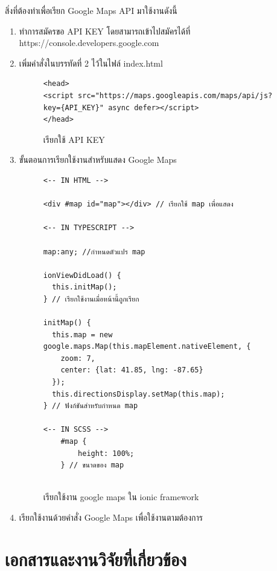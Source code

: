 	สิ่งที่ต้องทำเพื่อเรียก Google Maps API มาใช้งานดังนี้
	\begin{enumerate}[label=\arabic*)]
		\item ทำการสมัครขอ API KEY โดยสามารถเข้าไปสมัครได้ที่ https://console.developers.google.com
		\item เพิ่มคำสั่งในบรรทัดที่ 2 ไว้ในไฟล์ index.html
		
		\begin{figure}[H]
			{\begin{lstlisting}
<head>
<script src="https://maps.googleapis.com/maps/api/js?key={API_KEY}" async defer></script>
</head>
		\end{lstlisting}}
	\centering
		\caption{เรียกใช้ API KEY}
		\label{Fig:googlemapapi}
	\end{figure}

	\item ขั้นตอนการเรียกใช้งานสำหรับแสดง Google Maps
	
	\begin{figure}[H]
		{\begin{lstlisting}
<-- IN HTML -->

<div #map id="map"></div> // เรียกใช้ map เพื่อแสดง

<-- IN TYPESCRIPT -->

map:any; //กำหนดตัวแปร map

ionViewDidLoad() {
  this.initMap();
} // เรียกใช้งานเมื่อหน้านี้ถูกเรียก

initMap() {
  this.map = new google.maps.Map(this.mapElement.nativeElement, {
    zoom: 7,
    center: {lat: 41.85, lng: -87.65}
  });
  this.directionsDisplay.setMap(this.map);
} // ฟังก์ชันสำหรับกำหนด map

<-- IN SCSS -->
	#map {
		height: 100%;
	} // ขนาดของ map
					
				\end{lstlisting}}
			\centering
				\caption{เรียกใช้งาน google maps ใน ionic framework}
				\label{Fig:googlemapionic}
			\end{figure}
			\item เรียกใช้งานด้วยคำสั่ง Google Maps เพื่อใช้งานตามต้องการ
		\end{enumerate}
		
	  

\section{เอกสารและงานวิจัยที่เกี่ยวข้อง}

